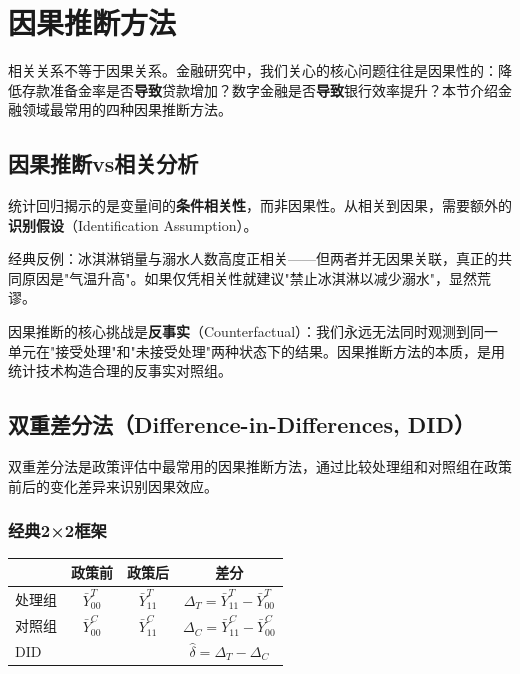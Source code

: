 \section{因果推断方法}

相关关系不等于因果关系。金融研究中，我们关心的核心问题往往是因果性的：降低存款准备金率是否\textbf{导致}贷款增加？数字金融是否\textbf{导致}银行效率提升？本节介绍金融领域最常用的四种因果推断方法。

\subsection{因果推断vs相关分析}

\begin{theorybox}[相关$\neq$因果]
统计回归揭示的是变量间的\textbf{条件相关性}，而非因果性。从相关到因果，需要额外的\textbf{识别假设}（Identification Assumption）。

经典反例：冰淇淋销量与溺水人数高度正相关——但两者并无因果关联，真正的共同原因是"气温升高"。如果仅凭相关性就建议"禁止冰淇淋以减少溺水"，显然荒谬。

因果推断的核心挑战是\textbf{反事实}（Counterfactual）：我们永远无法同时观测到同一单元在"接受处理"和"未接受处理"两种状态下的结果。因果推断方法的本质，是用统计技术构造合理的反事实对照组。
\end{theorybox}

\subsection{双重差分法（Difference-in-Differences, DID）}

双重差分法是政策评估中最常用的因果推断方法，通过比较处理组和对照组在政策前后的变化差异来识别因果效应。

\subsubsection{经典2×2框架}

\begin{table}[H]
\centering
\begin{tabular}{lccc}
\toprule
 & \textbf{政策前} & \textbf{政策后} & \textbf{差分} \\
\midrule
处理组 & $\bar{Y}_{00}^T$ & $\bar{Y}_{11}^T$ & $\Delta_T = \bar{Y}_{11}^T - \bar{Y}_{00}^T$ \\
对照组 & $\bar{Y}_{00}^C$ & $\bar{Y}_{11}^C$ & $\Delta_C = \bar{Y}_{11}^C - \bar{Y}_{00}^C$ \\
\midrule
DID & & & $\hat{\delta} = \Delta_T - \Delta_C$ \\
\bottomrule
\end{tabular}
\end{table}

